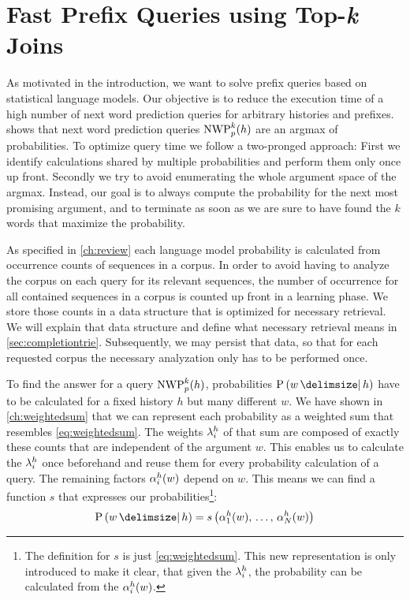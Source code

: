 \chapter{Fast Prefix Queries using Top-\emph{k} Joins}
\label{ch:topkjoin}

As motivated in the introduction, we want to solve prefix queries based
on statistical language models.
Our objective is to reduce the execution time of a high number of next word
prediction queries for arbitrary histories and prefixes.
 shows that next word prediction queries $\NWP[p][k](h)$
are an argmax of probabilities.
To optimize query time we follow a two-pronged approach:
First we identify calculations shared by multiple probabilities and perform
them only once up front.
Secondly we try to avoid enumerating the whole argument space of the argmax.
Instead, our goal is to always compute the probability for the next most
promising argument, and to terminate as soon as we are sure to have found the
$k$ words that maximize the probability.

As specified in \cref{ch:review} each language model probability  is calculated
from occurrence counts of sequences in a corpus.
In order to avoid having to analyze the corpus on each query for its relevant
sequences, the number of occurrence for all contained sequences in a corpus is
counted up front in a learning phase.
We store those counts in a data structure that is optimized for necessary
retrieval.
We will explain that data structure and define what necessary retrieval means
in \cref{sec:completiontrie}.
Subsequently, we may persist that data, so that for each requested corpus the
necessary analyzation only has to be performed once.

To find the answer for a query $\NWP[p][k]{h}$, probabilities $\Prob{w}{h}$ have
to be calculated for a fixed history $h$ but many different $w$.
We have shown in \cref{ch:weightedsum} that we can represent each probability
as a weighted sum that resembles \cref{eq:weightedsum}.
The weights $\lambda^h_i$ of that sum are composed of exactly these counts
that are independent of the argument $w$.
This enables us to calculate the $\lambda_i^h$ once beforehand and reuse them
for every probability calculation of a query.
The remaining factors $\alpha^h_i(w)$ depend on $w$.
This means we can find a function $s$ that expresses our
probabilities\footnote{The definition for $s$ is just \cref{eq:weightedsum}.
This new representation is only introduced to make it clear, that given the
$\lambda^h_i$, the probability can be calculated from the $\alpha^h_i(w)$.}:
\begin{equation}
  \label{eq:scoringfunc}
  \Prob{w}{h} = s\left(\SumArg^h_1(w), \, \ldots, \, \SumArg^h_N(w)\right)
\end{equation}

